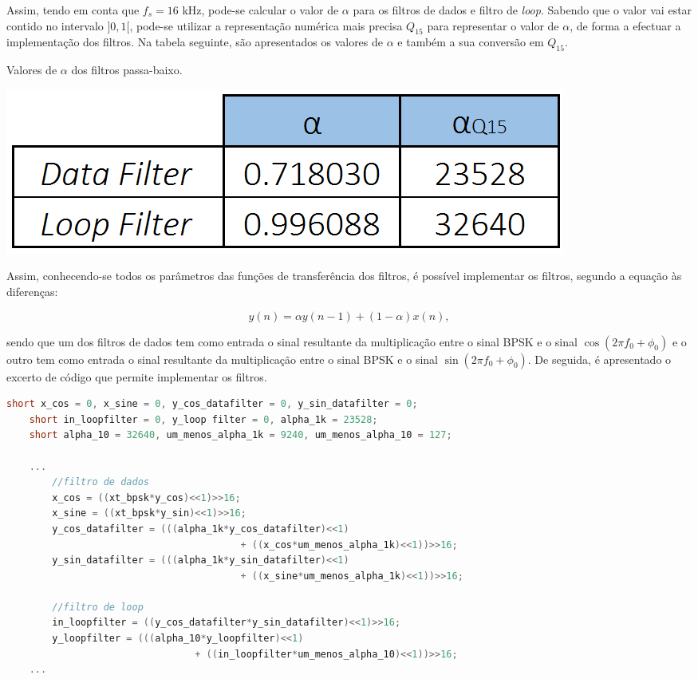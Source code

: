 \documentclass[11pt]{article}
\numberwithin{equation}{section}
\begin{document}
\vspace{1mm}
Assim, tendo em conta que $f_s = 16$ kHz, pode-se calcular o valor de $\alpha$ para os filtros de dados e filtro de \textit{loop}. Sabendo que o valor vai estar contido no intervalo $]0,1[$, pode-se utilizar a representação numérica mais precisa $Q_{15}$ para representar o valor de $\alpha$, de forma a efectuar a implementação dos filtros. Na tabela seguinte, são apresentados os valores de $\alpha$ e também a sua conversão em $Q_{15}$.

\begin{table}[H]
	\centering
	\caption{Valores de $\alpha$ dos filtros passa-baixo.}
	\vspace{-1.5mm}
	\includegraphics[keepaspectratio=true, scale=0.35]{tabelas/alphas}
\end{table}

Assim, conhecendo-se todos os parâmetros das funções de transferência dos filtros, é possível implementar os filtros, segundo a equação às diferenças:

\vspace{-3mm}
\begin{equation}
y(n) = \alpha y(n-1) +  (1-\alpha)x(n),
\end{equation} 

\vspace{1mm}
sendo que um dos filtros de dados tem como entrada o sinal resultante da multiplicação entre o sinal BPSK e o sinal $\cos(2\pi f_0 + \phi_0)$ e o outro tem como entrada o sinal resultante da multiplicação entre o sinal BPSK e o sinal $\sin(2\pi f_0 + \phi_0)$. De seguida, é apresentado o excerto de código que permite implementar os filtros. 

\begin{lstlisting}[language=C]
	short x_cos = 0, x_sine = 0, y_cos_datafilter = 0, y_sin_datafilter = 0;  
	short in_loopfilter = 0, y_loop filter = 0, alpha_1k = 23528; 
	short alpha_10 = 32640, um_menos_alpha_1k = 9240, um_menos_alpha_10 = 127;

	...
		//filtro de dados
		x_cos = ((xt_bpsk*y_cos)<<1)>>16;
		x_sine = ((xt_bpsk*y_sin)<<1)>>16;
		y_cos_datafilter = (((alpha_1k*y_cos_datafilter)<<1)
										 + ((x_cos*um_menos_alpha_1k)<<1))>>16;
		y_sin_datafilter = (((alpha_1k*y_sin_datafilter)<<1)
										 + ((x_sine*um_menos_alpha_1k)<<1))>>16;
	
		//filtro de loop
		in_loopfilter = ((y_cos_datafilter*y_sin_datafilter)<<1)>>16;
		y_loopfilter = (((alpha_10*y_loopfilter)<<1) 
								 + ((in_loopfilter*um_menos_alpha_10)<<1))>>16;
	...
\end{lstlisting}
\end{document}
